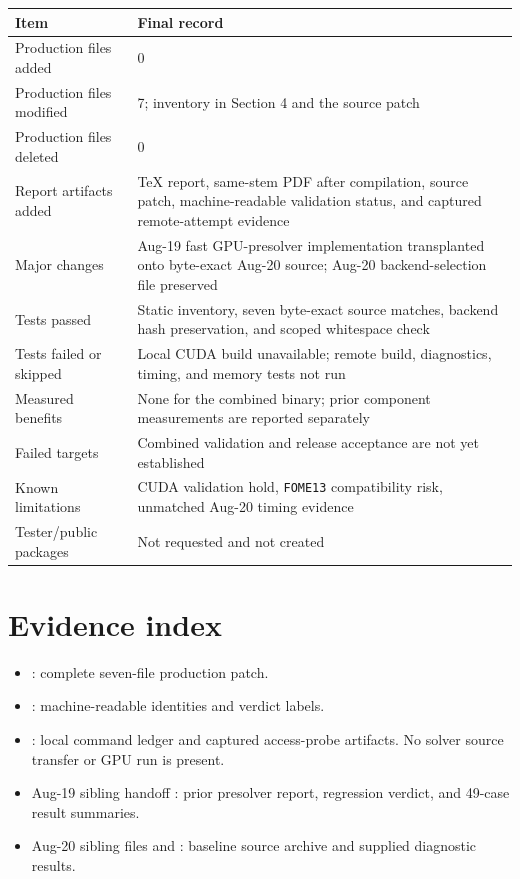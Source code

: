 \documentclass[10pt,a4paper]{article}
\begin{document}
\begin{tabularx}{\textwidth}{@{}P{0.34\textwidth}Y@{}}
\toprule
\textbf{Item} & \textbf{Final record}\\
\midrule
Production files added & 0\\
Production files modified & 7; inventory in Section 4 and the source patch\\
Production files deleted & 0\\
Report artifacts added & TeX report, same-stem PDF after compilation, source patch, machine-readable validation status, and captured remote-attempt evidence\\
Major changes & Aug-19 fast GPU-presolver implementation transplanted onto byte-exact Aug-20 source; Aug-20 backend-selection file preserved\\
Tests passed & Static inventory, seven byte-exact source matches, backend hash preservation, and scoped whitespace check\\
Tests failed or skipped & Local CUDA build unavailable; remote build, diagnostics, timing, and memory tests not run\\
Measured benefits & None for the combined binary; prior component measurements are reported separately\\
Failed targets & Combined validation and release acceptance are not yet established\\
Known limitations & CUDA validation hold, \texttt{FOME13} compatibility risk, unmatched Aug-20 timing evidence\\
Tester/public packages & Not requested and not created\\
\bottomrule
\end{tabularx}

\appendix
\section{Evidence index}

\begin{itemize}
  \item {}: complete seven-file production patch.
  \item {}: machine-readable identities and verdict labels.
  \item {}: local command ledger and captured access-probe artifacts.  No solver source transfer or GPU run is present.
  \item Aug-19 sibling handoff : prior presolver report, regression verdict, and 49-case result summaries.
  \item Aug-20 sibling files  and : baseline source archive and supplied diagnostic results.
\end{itemize}
\end{document}

